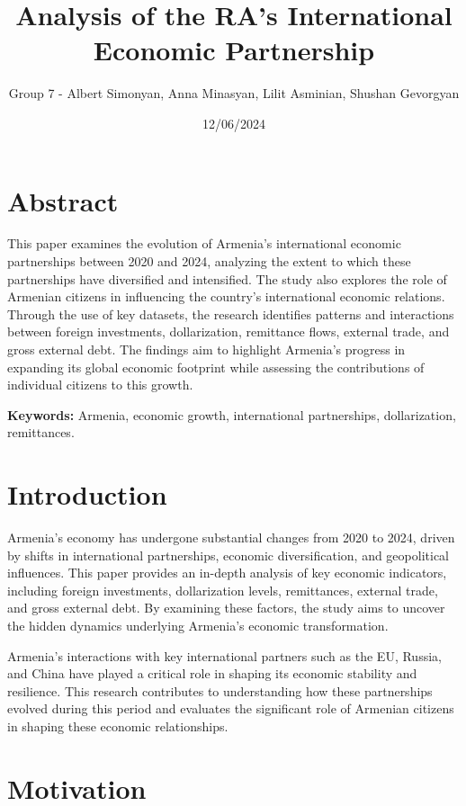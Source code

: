 \documentclass[
]{article}
\title{Analysis of the RA's International Economic Partnership}
\author{Group 7 - Albert Simonyan, Anna Minasyan, Lilit Asminian,
Shushan Gevorgyan}
\date{12/06/2024}
\begin{document}
\maketitle

{
\setcounter{tocdepth}{2}
\tableofcontents
}
\newpage

\section{Abstract}\label{abstract}

This paper examines the evolution of Armenia's international economic
partnerships between 2020 and 2024, analyzing the extent to which these
partnerships have diversified and intensified. The study also explores
the role of Armenian citizens in influencing the country's international
economic relations. Through the use of key datasets, the research
identifies patterns and interactions between foreign investments,
dollarization, remittance flows, external trade, and gross external
debt. The findings aim to highlight Armenia's progress in expanding its
global economic footprint while assessing the contributions of
individual citizens to this growth.

\textbf{Keywords:} Armenia, economic growth, international partnerships,
dollarization, remittances.

\section{Introduction}\label{introduction}

Armenia's economy has undergone substantial changes from 2020 to 2024,
driven by shifts in international partnerships, economic
diversification, and geopolitical influences. This paper provides an
in-depth analysis of key economic indicators, including foreign
investments, dollarization levels, remittances, external trade, and
gross external debt. By examining these factors, the study aims to
uncover the hidden dynamics underlying Armenia's economic
transformation.

Armenia's interactions with key international partners such as the EU,
Russia, and China have played a critical role in shaping its economic
stability and resilience. This research contributes to understanding how
these partnerships evolved during this period and evaluates the
significant role of Armenian citizens in shaping these economic
relationships.

\section{Motivation}\label{motivation}
\end{document}
